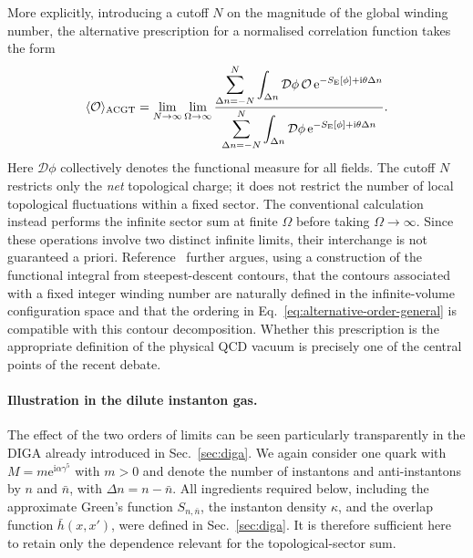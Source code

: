 \documentclass[review]{elsarticle}
\numberwithin{equation}{section}
\numberwithin{table}{section}
\numberwithin{figure}{section}
\def\i{\mathrm{i}}
\def\e{\mathrm{e}}
\begin{document}
More explicitly, introducing a cutoff $N$ on the magnitude of the global winding number, the alternative prescription for a normalised correlation function takes the form
\begin{align}
    \langle\mathcal O\rangle_{\rm ACGT}
    =
    \lim_{N\to\infty}
    \lim_{\Omega\to\infty}
    \frac{
        \displaystyle
        \sum_{\Delta n=-N}^{N}
        \int_{\Delta n}\mathcal D\phi\,
        \mathcal O\,
        \e^{-S_{\rm E}[\phi]+\i\theta\Delta n}
    }{
        \displaystyle
        \sum_{\Delta n=-N}^{N}
        \int_{\Delta n}\mathcal D\phi\,
        \e^{-S_{\rm E}[\phi]+\i\theta\Delta n}
    }.
    \label{eq:alternative-order-general}
\end{align}
Here $\mathcal D\phi$ collectively denotes the functional measure for all fields. The cutoff $N$ restricts only the \emph{net} topological charge; it does not restrict the number of local topological fluctuations within a fixed sector. The conventional calculation instead performs the infinite sector sum at finite $\Omega$ before taking $\Omega\to\infty$. Since these operations involve two distinct infinite limits, their interchange is not guaranteed a priori. Reference~\cite{Ai:2024cnp} further argues, using a construction of the functional integral from steepest-descent contours, that the contours associated with a fixed integer winding number are naturally defined in the infinite-volume configuration space and that the ordering in Eq.~\eqref{eq:alternative-order-general} is compatible with this contour decomposition. Whether this prescription is the appropriate definition of the physical QCD vacuum is precisely one of the central points of the recent debate.

\paragraph{Illustration in the dilute instanton gas.}

The effect of the two orders of limits can be seen particularly transparently in the DIGA already introduced in Sec.~\ref{sec:diga}. We again consider one quark with $M=m\e^{\i\alpha\gamma^5}$ with $m>0$ and denote the number of instantons and anti-instantons by $n$ and $\bar n$, with $\Delta n =n-\bar n$. All ingredients required below, including the approximate Green's function $S_{n,\bar n}$, the instanton density $\kappa$, and the overlap function $\bar h(x,x')$, were defined in Sec.~\ref{sec:diga}. It is therefore sufficient here to retain only the dependence relevant for the topological-sector sum.
\end{document}
